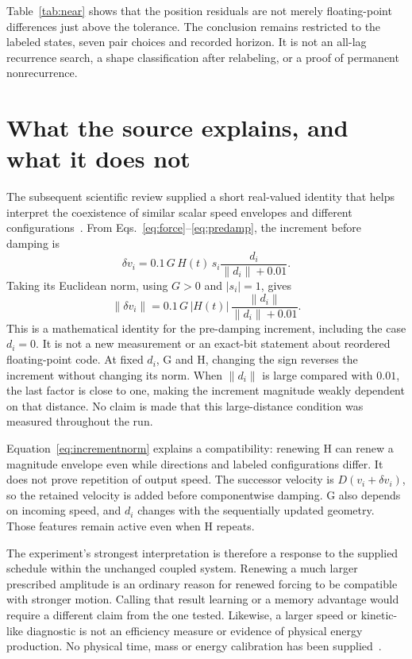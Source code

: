 \documentclass[11pt,a4paper]{article}
\newcommand{\norm}[1]{\left\lVert #1\right\rVert}
\begin{document}
Table~\ref{tab:near} shows that the position residuals are not merely floating-point differences just above the tolerance. The conclusion remains restricted to the labeled states, seven pair choices and recorded horizon. It is not an all-lag recurrence search, a shape classification after relabeling, or a proof of permanent nonrecurrence.

\section{What the source explains, and what it does not}
\label{sec:identity}
The subsequent scientific review supplied a short real-valued identity that helps interpret the coexistence of similar scalar speed envelopes and different configurations~\cite{review}. From Eqs.~\eqref{eq:force}--\eqref{eq:predamp}, the increment before damping is
\begin{equation}
 \delta v_i=0.1\,G\,H(t)\,s_i\frac{d_i}{\norm{d_i}+0.01}.
 \label{eq:increment}
\end{equation}
Taking its Euclidean norm, using $G>0$ and $|s_i|=1$, gives
\begin{equation}
 \norm{\delta v_i}=0.1\,G\,|H(t)|\,
 \frac{\norm{d_i}}{\norm{d_i}+0.01}.
 \label{eq:incrementnorm}
\end{equation}
This is a mathematical identity for the pre-damping increment, including the case $d_i=0$. It is not a new measurement or an exact-bit statement about reordered floating-point code. At fixed $d_i$, G and H, changing the sign reverses the increment without changing its norm. When $\norm{d_i}$ is large compared with $0.01$, the last factor is close to one, making the increment magnitude weakly dependent on that distance. No claim is made that this large-distance condition was measured throughout the run.

Equation~\eqref{eq:incrementnorm} explains a compatibility: renewing H can renew a magnitude envelope even while directions and labeled configurations differ. It does not prove repetition of output speed. The successor velocity is $D(v_i+\delta v_i)$, so the retained velocity is added before componentwise damping. G also depends on incoming speed, and $d_i$ changes with the sequentially updated geometry. Those features remain active even when H repeats.

The experiment's strongest interpretation is therefore a response to the supplied schedule within the unchanged coupled system. Renewing a much larger prescribed amplitude is an ordinary reason for renewed forcing to be compatible with stronger motion. Calling that result learning or a memory advantage would require a different claim from the one tested. Likewise, a larger speed or kinetic-like diagnostic is not an efficiency measure or evidence of physical energy production. No physical time, mass or energy calibration has been supplied~\cite{sim02,review}.
\end{document}
